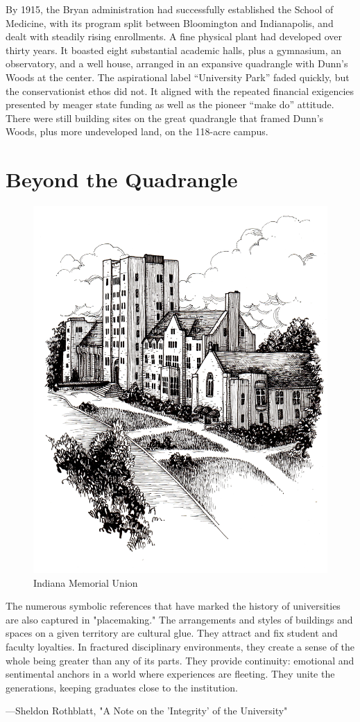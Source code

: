 \documentclass[
  american,
  letterpaper,
]{scrreprt}
\begin{document}
By 1915, the Bryan administration had successfully established the
School of Medicine, with its program split between Bloomington and
Indianapolis, and dealt with steadily rising enrollments. A fine
physical plant had developed over thirty years. It boasted eight
substantial academic halls, plus a gymnasium, an observatory, and a well
house, arranged in an expansive quadrangle with Dunn's Woods at the
center. The aspirational label ``University Park'' faded quickly, but
the conservationist ethos did not. It aligned with the repeated
financial exigencies presented by meager state funding as well as the
pioneer ``make do'' attitude. There were still building sites on the
great quadrangle that framed Dunn's Woods, plus more undeveloped land,
on the 118-acre campus.


\chapter{Beyond the Quadrangle}\label{sec-five}

\begin{figure}[H]

{\centering \includegraphics[width=0.6\linewidth,height=\textheight,keepaspectratio]{images/miu5.jpeg}

}

\caption{Indiana Memorial Union}

\end{figure}%

\epigraph{
The numerous symbolic references that have marked the history of universities are also captured in "placemaking." The arrangements and styles of buildings and spaces on a given territory are cultural glue. They attract and fix student and faculty loyalties. In fractured disciplinary environments, they create a sense of the whole being greater than any of its parts. They provide continuity: emotional and sentimental anchors in a world where experiences are fleeting. They unite the generations, keeping graduates close to the institution. 
}
{---Sheldon Rothblatt, "A Note on the 'Integrity' of the University"}
\end{document}
